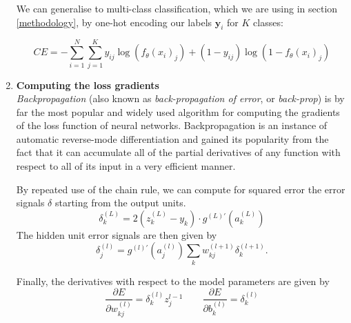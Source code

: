 \documentclass[bsc,frontabs,twoside,singlespacing,parskip,deptreport]{infthesis}     %
\begin{document}
\begin{enumerate}
We can generalise to multi-class classification, which we are using in section \ref{methodology}, by one-hot encoding our labels \(\mathbf{y}_{i}\) for \(K\) classes:

\begin{equation}
   CE = -\sum_{i=1}^{N} \sum_{j=1}^{K} y_{i j} \log \left(f_{\theta}\left(x_{i}\right)_{j}\right)+\left(1-y_{i j}\right) \log \left(1-f_{\theta}\left(x_{i}\right)_{j}\right)
\end{equation}

    
    \item{ \bf{Computing the loss gradients} } \\
    \textit{Backpropagation} (also known as \textit{back-propagation of error}, or \textit{back-prop}) \cite{rumelhart_learning_1986} is by far the most popular and widely used algorithm for computing the gradients of the loss function of neural networks. Backpropagation is an instance of automatic reverse-mode differentiation and gained its popularity from the fact that it can accumulate all of the partial derivatives of any function with respect to all of its input in a very efficient manner. 

By repeated use of the chain rule, we can compute for squared error the error signals \(\delta\) starting from the output units.
\[\delta_{k}^{(L)}=2\left(z_{k}^{(L)}-y_{k}\right) \cdot g^{(L)\prime}\left(a_{k}^{(L)}\right)\]
The hidden unit error signals are then given by
\[\delta_{j}^{(l)}=g^{(l)\prime}\left(a_{j}^{(l)}\right) \sum_{k} w_{k j}^{(l+1)} \delta_{k}^{(l+1)}.\]

Finally, the derivatives with respect to the model parameters are given by
\[\frac{\partial E}{\partial w_{k j}^{(l)}}=\delta_{k}^{(l)} z_{j}^{l-1} \quad\quad \frac{\partial E}{\partial b_{k}^{(l)}}=\delta_{k}^{(l)}\]
    
    
    
    


\end{enumerate}
\end{document}
